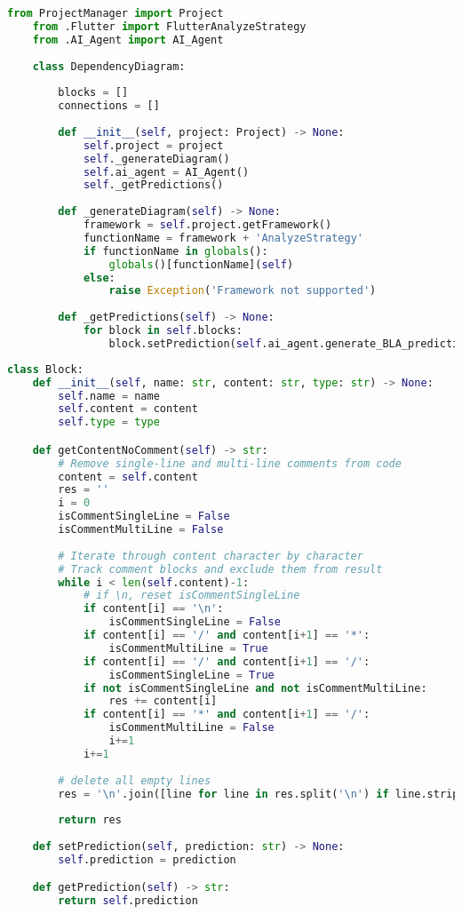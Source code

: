 \begin{lstlisting}[language=Python, caption={$\texttt{DependencyDiagram}$ class.}, label={lst:3}]
    from ProjectManager import Project
    from .Flutter import FlutterAnalyzeStrategy
    from .AI_Agent import AI_Agent
    
    class DependencyDiagram:
        
        blocks = []
        connections = []
        
        def __init__(self, project: Project) -> None:
            self.project = project
            self._generateDiagram()
            self.ai_agent = AI_Agent()
            self._getPredictions()
        
        def _generateDiagram(self) -> None:
            framework = self.project.getFramework()
            functionName = framework + 'AnalyzeStrategy'
            if functionName in globals():
                globals()[functionName](self)
            else:
                raise Exception('Framework not supported')
            
        def _getPredictions(self) -> None:
            for block in self.blocks:
                block.setPrediction(self.ai_agent.generate_BLA_prediction(source_code=block.getContentNoComment(), chat_history=[]))
\end{lstlisting}

\begin{lstlisting}[language=Python, caption={$\texttt{Block}$ class.}, label={lst:4}]
    class Block:
    def __init__(self, name: str, content: str, type: str) -> None:
        self.name = name
        self.content = content
        self.type = type

    def getContentNoComment(self) -> str:
        # Remove single-line and multi-line comments from code
        content = self.content
        res = ''
        i = 0
        isCommentSingleLine = False
        isCommentMultiLine = False
        
        # Iterate through content character by character
        # Track comment blocks and exclude them from result
        while i < len(self.content)-1:
            # if \n, reset isCommentSingleLine
            if content[i] == '\n':
                isCommentSingleLine = False
            if content[i] == '/' and content[i+1] == '*':
                isCommentMultiLine = True
            if content[i] == '/' and content[i+1] == '/':
                isCommentSingleLine = True
            if not isCommentSingleLine and not isCommentMultiLine:
                res += content[i]
            if content[i] == '*' and content[i+1] == '/':
                isCommentMultiLine = False
                i+=1
            i+=1
        
        # delete all empty lines
        res = '\n'.join([line for line in res.split('\n') if line.strip() != ''])
        
        return res
    
    def setPrediction(self, prediction: str) -> None:
        self.prediction = prediction

    def getPrediction(self) -> str:
        return self.prediction
\end{lstlisting}

